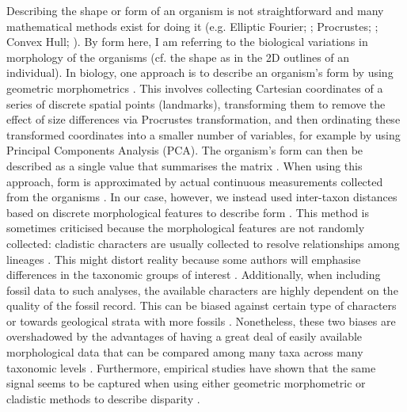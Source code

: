 Describing the shape or form of an organism is not straightforward and many mathematical methods exist for doing it (e.g. Elliptic Fourier; \citealt{Fourier1982}; Procrustes; \citealt{JamesRohlf1993129}; Convex Hull; \citealt{ANDREW1979216}).
By form here, I am referring to the biological variations in morphology of the organisms (cf. the shape as in the 2D outlines of an individual).
In biology, one approach is to describe an organism's form by using geometric morphometrics \citep{zelditch2012geometric}.
This involves collecting Cartesian coordinates of a series of discrete spatial points (landmarks), transforming them to remove the effect of size differences via Procrustes transformation, and then ordinating these transformed coordinates into a smaller number of variables, for example by using Principal Components Analysis (PCA).
The organism's form can then be described as a single value that summarises the matrix \citep[e.g. the sum of the ranges of each PCA axis;][]{zelditch2012geometric}.
When using this approach, form is approximated by actual continuous measurements collected from the organisms \citep[e.g.][]{friedmanexplosive2010,hopkinsdecoupling2013,finlay2015morphological}.
In our case, however, we instead used inter-taxon distances based on discrete morphological features to describe form \citep[i.e. the cladistic disparity method; e.g.][]{foote1997evolution,Wills2001,Wesley-Hunt2005}.
This method is sometimes criticised because the morphological features are not randomly collected: cladistic characters are usually collected to resolve relationships among lineages \citep{O'Leary08022013}.
This might distort reality because some authors will emphasise differences in the taxonomic groups of interest \citep{Hopkins24032015}.
Additionally, when including fossil data to such analyses, the available characters are highly dependent on the quality of the fossil record.
This can be biased against certain type of characters \citep[e.g. soft tissues;][]{sansomfossilization2013} or towards geological strata with more fossils \citep[e.g. \textit{Lagerst\"{a}tten};][]{Butler2012}.
Nonetheless, these two biases are overshadowed by the advantages of having a great deal of easily available morphological data \citep[some morphological matrices have more than 1000 characters; e.g.][]{O'Leary08022013,ni2013oldest} that can be compared among many taxa across many taxonomic levels \citep[e.g. across all mammals;][]{O'Leary08022013,Slater2012MEE,beckancient2014}.
Furthermore, empirical studies have shown that the same signal seems to be captured when using either geometric morphometric or cladistic methods to describe disparity \citep{foth2012different,hetherington2015cladistic}. 

